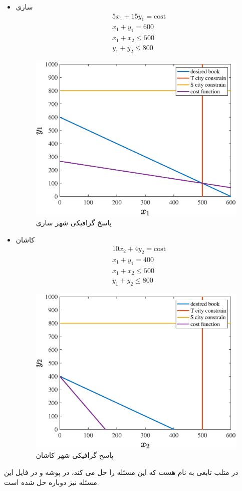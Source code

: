 \begin{itemize}
	\item ساری
	\begin{align*}
		& 5x_1 + 15y_1 = \text{cost}  \\
		&x_1 + y_1 = 600\\
		&x_1 + x_2 \leq 500\\
		&y_1 + y_2 \leq 800
	\end{align*}
	  \begin{figure}[H]
		\caption{پاسخ گرافیکی شهر ساری} 
		\centering 
		\includegraphics[width=12cm]{../Figure/Q1/S_city} 
	\end{figure}
	\item  کاشان
	\begin{align*}
		& 10x_2 + 4y_2 = \text{cost}  \\
		&x_1 + y_1 = 400\\
		&x_1 + x_2 \leq 500\\
		&y_1 + y_2 \leq 800
	\end{align*}
  \begin{figure}[H]
	\caption{پاسخ گرافیکی شهر کاشان} 
	\centering 
	\includegraphics[width=12cm]{../Figure/Q1/K_city} 
\end{figure}
\end{itemize}
در متلب تابعی به نام 
هست که این مسئله را حل می کند، در پوشه 
و در فایل 
این مسئله نیز دوباره حل شده است.

